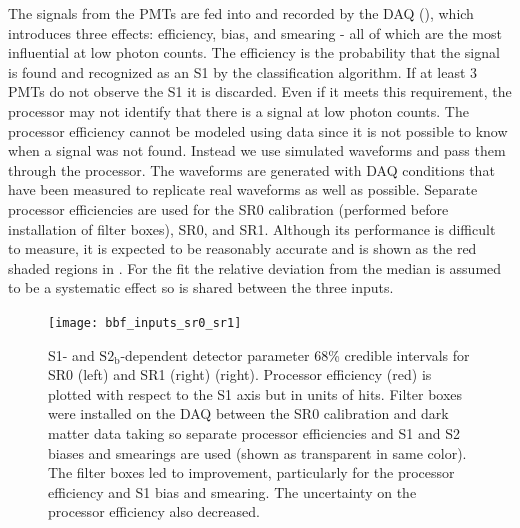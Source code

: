 The signals from the PMTs are fed into and recorded by the DAQ (), which introduces three effects:
efficiency, bias, and smearing - all of which are the most influential at low photon counts.  The efficiency is the probability that
the signal is found and recognized as an S1 by the
classification algorithm.  If at least 3 PMTs do not observe the S1 it is discarded.  Even if it meets this requirement, the processor
may not identify that there is a signal at low photon counts.  The processor efficiency cannot be modeled using data since it is
not possible to know when a signal was not found.  Instead we use simulated waveforms and pass them through the processor.  The
waveforms are generated with DAQ conditions that have been measured to replicate real waveforms as well as possible.  Separate
processor efficiencies are used for the SR0 \ambe calibration (performed before installation of filter boxes), SR0, and SR1.  Although its
performance is difficult to measure, it is expected to be reasonably accurate and is shown as the red shaded regions in
.  For the fit the relative deviation from the median is assumed to be a
systematic effect so is shared between the three inputs.

\begin{figure}
\centering
\texttt{[image: bbf\_inputs\_sr0\_sr1]}
\caption{S1- and $\mathrm{S2_b}$-dependent detector parameter 68\% credible intervals for SR0 (left) and SR1 (right)
(right).  Processor efficiency (red) is plotted with respect to the
S1 axis but in units of hits.  Filter boxes were installed on the DAQ between the SR0 \ambe calibration and
dark matter data taking so separate processor efficiencies and S1 and S2 biases and smearings are used (shown as transparent in same
color).  The filter boxes led to improvement, particularly for the processor efficiency and S1 bias and smearing.  The uncertainty on the
processor efficiency also decreased.}
\label{fig:er_nr_calibrations_parameter_determ_det_phys_inputs}
\end{figure}

